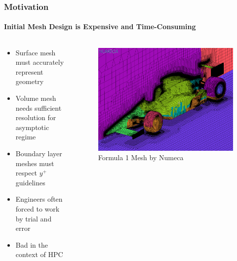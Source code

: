\documentclass[18pt,xcolor=table]{beamer}
\begin{document}
\begin{frame}[t]
\frametitle{Motivation}
\framesubtitle{Initial Mesh Design is Expensive and Time-Consuming}
\begin{columns}[t]
\begin{column}[c]{0.4\textwidth}
\begin{itemize}
  \item Surface mesh must accurately represent geometry
  \item Volume mesh needs sufficient resolution for asymptotic regime
  \item Boundary layer meshes must respect $y^+$ guidelines
  \item Engineers often forced to work by trial and error
  \item Bad in the context of HPC
\end{itemize}
\end{column}
\begin{column}[c]{0.6\textwidth}
\vspace{2ex}
\begin{figure}[t]
\centering
\includegraphics[width=1.0\textwidth]{Motivation/NumecaRaceCar.png}
\\\small{Formula 1 Mesh by Numeca}\\
\end{figure}
\end{column}
\end{columns}
\end{frame}
\end{document}
